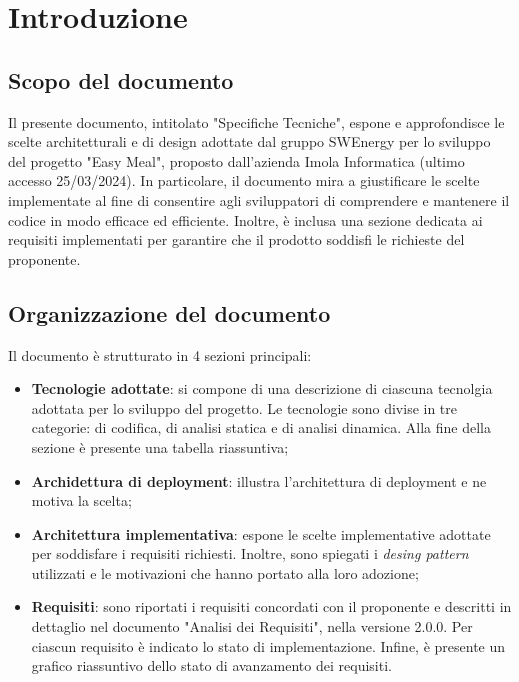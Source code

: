 \section{Introduzione}

\subsection{Scopo del documento}

Il presente documento, intitolato "Specifiche Tecniche", espone e approfondisce
le scelte architetturali e di design adottate dal gruppo SWEnergy per lo
sviluppo del progetto "Easy Meal", proposto dall'azienda Imola Informatica
(ultimo accesso 25/03/2024). In particolare, il documento mira a giustificare le
scelte implementate al fine di consentire agli sviluppatori di comprendere e
mantenere il codice in modo efficace ed efficiente. Inoltre, è inclusa una
sezione dedicata ai requisiti implementati per garantire che il prodotto
soddisfi le richieste del proponente.

\subsection{Organizzazione del documento}

Il documento è strutturato in 4 sezioni principali:

\begin{itemize}
	\item \textbf{Tecnologie adottate}: si compone di una descrizione di
	      ciascuna tecnolgia adottata per lo sviluppo del progetto.
	      Le tecnologie sono divise in tre categorie: di codifica,
	      di analisi statica e di analisi dinamica. Alla fine della sezione è
	      presente una tabella riassuntiva;

	\item \textbf{Archidettura di deployment}: illustra l'architettura di
	      deployment e ne motiva la scelta;

	\item \textbf{Architettura implementativa}: espone le scelte implementative
	      adottate per soddisfare i requisiti richiesti. Inoltre, sono spiegati
	      i \textit{desing pattern} utilizzati e le motivazioni che hanno
	      portato alla loro adozione;

	\item \textbf{Requisiti}: sono riportati i requisiti concordati con il
	      proponente e descritti in dettaglio nel documento "Analisi dei
	      Requisiti", nella versione 2.0.0. Per ciascun requisito è indicato lo
	      stato di implementazione. Infine, è presente un grafico riassuntivo
	      dello stato di avanzamento dei requisiti.
\end{itemize}


